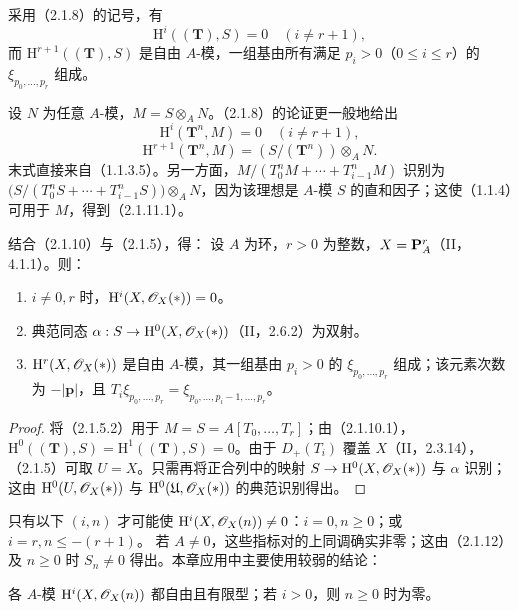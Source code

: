 采用（2.1.8）的记号，有
\begin{equation}\tag{2.1.10.1}
\mathrm H^i((\mathbf T),S)=0\quad(i\ne r+1),
\end{equation}
而 $\mathrm H^{r+1}((\mathbf T),S)$ 是自由 $A$-模，一组基由所有满足 $p_i>0$（$0\leq i\leq r$）的 $\xi_{p_0,\ldots,p_r}$ 组成。

设 $N$ 为任意 $A$-模，$M=S\otimes_AN$。（2.1.8）的论证更一般地给出
\begin{equation}\tag{2.1.11.1}
\mathrm H^i(\mathbf T^n,M)=0\quad(i\ne r+1),
\end{equation}
\begin{equation}\tag{2.1.11.2}
\mathrm H^{r+1}(\mathbf T^n,M)=(S/(\mathbf T^n))\otimes_AN.
\end{equation}
末式直接来自（1.1.3.5）。另一方面，$M/(T_0^nM+\cdots+T_{i-1}^nM)$ 识别为
$\bigl(S/(T_0^nS+\cdots+T_{i-1}^nS)\bigr)\otimes_AN$，因为该理想是 $A$-模 $S$ 的直和因子；这使（1.1.4）可用于 $M$，得到（2.1.11.1）。

结合（2.1.10）与（2.1.5），得：
设 $A$ 为环，$r>0$ 为整数，$X=\mathbf P_A^r$（II，4.1.1）。则：
\begin{enumerate}[label=(\roman*)]
\item $i\ne0,r$ 时，$\mathrm H^i(X,\mathscr O_X(*))=0$。
\item 典范同态 $\alpha:S\to\mathrm H^0(X,\mathscr O_X(*))$（II，2.6.2）为双射。
\item $\mathrm H^r(X,\mathscr O_X(*))$ 是自由 $A$-模，其一组基由 $p_i>0$ 的 $\xi_{p_0,\ldots,p_r}$ 组成；该元素次数为 $-|\mathbf p|$，且 $T_i\xi_{p_0,\ldots,p_r}=\xi_{p_0,\ldots,p_i-1,\ldots,p_r}$。
\end{enumerate}
\begin{proof}
将（2.1.5.2）用于 $M=S=A[T_0,\ldots,T_r]$；由（2.1.10.1），$\mathrm H^0((\mathbf T),S)=\mathrm H^1((\mathbf T),S)=0$。由于 $D_+(T_i)$ 覆盖 $X$（II，2.3.14），（2.1.5）可取 $U=X$。只需再将正合列中的映射 $S\to\mathrm H^0(X,\mathscr O_X(*))$ 与 $\alpha$ 识别；这由 $\mathrm H^0(U,\mathscr O_X(*))$ 与 $\mathrm H^0(\mathfrak U,\mathscr O_X(*))$ 的典范识别得出。
\end{proof}

只有以下 $(i,n)$ 才可能使 $\mathrm H^i(X,\mathscr O_X(n))\ne0$：$i=0,n\geq0$；或 $i=r,n\leq-(r+1)$。
若 $A\ne0$，这些指标对的上同调确实非零；这由（2.1.12）及 $n\geq0$ 时 $S_n\ne0$ 得出。本章应用中主要使用较弱的结论：

各 $A$-模 $\mathrm H^i(X,\mathscr O_X(n))$ 都自由且有限型；若 $i>0$，则 $n\geq0$ 时为零。

